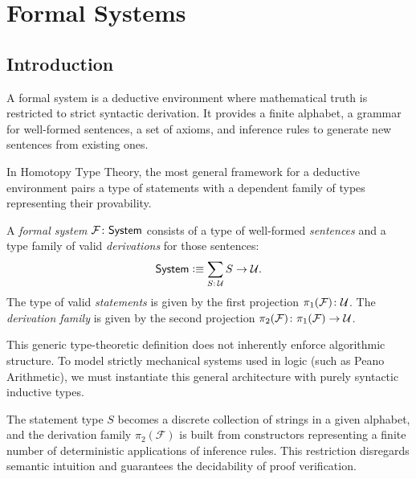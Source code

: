\chapter{Formal Systems}

\section{Introduction}

A formal system is a deductive environment where mathematical truth is restricted to strict syntactic derivation. It provides a finite alphabet, a grammar for well-formed sentences, a set of axioms, and inference rules to generate new sentences from existing ones.

In Homotopy Type Theory, the most general framework for a deductive environment pairs a type of statements with a dependent family of types representing their provability.

\begin{defn}
    A \textsl{formal system} $\mathcal{F}\colon\fun{System}$ consists of a type of well-formed \textsl{sentences} and a type family of valid \textsl{derivations} for those sentences:
    \[
        \fun{System}\defeq\sum_{S\colon\univ}S\to\univ.
    \]
    The type of valid \textsl{statements} is given by the first projection $\pi_1(\mathcal{F})\colon\univ$. The \textsl{derivation family} is given by the second projection $\pi_2(\mathcal{F})\colon\pi_1(\mathcal F)\to\univ$. 
\end{defn}

This generic type-theoretic definition does not inherently enforce algorithmic structure. To model strictly mechanical systems used in logic (such as Peano Arithmetic), we must instantiate this general architecture with purely syntactic inductive types. 

The statement type $S$ becomes a discrete collection of strings in a given alphabet, and the derivation family $\pi_2(\mathcal{F})$ is built from constructors representing a finite number of deterministic applications of inference rules. This restriction disregards semantic intuition and guarantees the decidability of proof verification.

